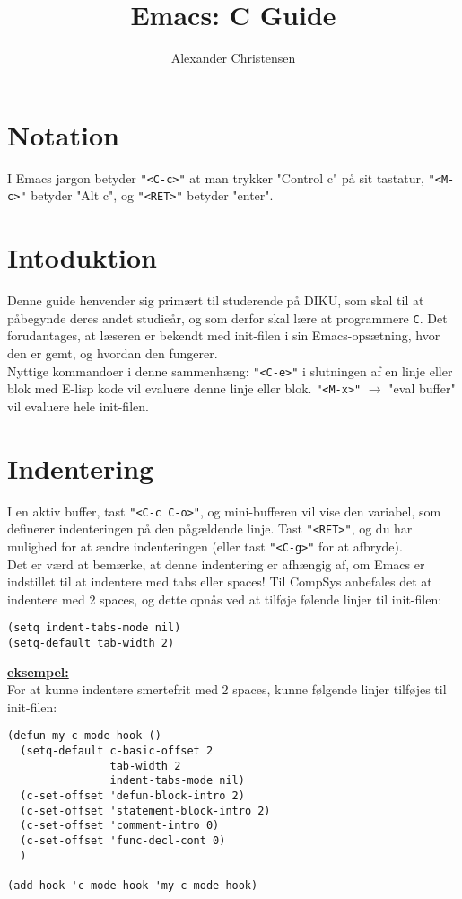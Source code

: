 \documentclass[a4paper, 9pt]{article}
\title{Emacs: C Guide}
\author{Alexander Christensen}
\newcommand{\key}[1]{\texttt{"<#1>"}}
\begin{document}
\maketitle


\section{Notation}
I Emacs jargon betyder \key{C-c} at man trykker "Control c" på sit tastatur, \key{M-c} betyder "Alt c", og \key{RET} betyder "enter".

\section{Intoduktion}
Denne guide henvender sig primært til studerende på DIKU, som skal til at påbegynde deres andet studieår, og som derfor skal lære at programmere \texttt{C}. Det forudantages, at læseren er bekendt med init-filen i sin Emacs-opsætning, hvor den er gemt, og hvordan den fungerer.\\

Nyttige kommandoer i denne sammenhæng: \key{C-e} i slutningen af en linje eller blok med E-lisp kode vil evaluere denne linje eller blok. \key{M-x} $\rightarrow$ "eval buffer" vil evaluere hele init-filen.


\newpage
\section{Indentering}
I en aktiv buffer, tast \key{C-c C-o}, og mini-bufferen vil vise den variabel, som definerer indenteringen på den pågældende linje. Tast \key{RET}, og du har mulighed for at ændre indenteringen (eller tast \key{C-g} for at afbryde).\\

Det er værd at bemærke, at denne indentering er afhængig af, om Emacs er indstillet til at indentere med tabs eller spaces! Til CompSys anbefales det at indentere med 2 spaces, og dette opnås ved at tilføje følende linjer til init-filen:
\begin{verbatim}
(setq indent-tabs-mode nil)
(setq-default tab-width 2)
\end{verbatim}

\vspace{3mm}\noindent\textbf{\underline{eksempel:}}\vspace{2mm}\\
For at kunne indentere smertefrit med 2 spaces, kunne følgende linjer tilføjes til init-filen:
\begin{verbatim}
(defun my-c-mode-hook ()
  (setq-default c-basic-offset 2
                tab-width 2
                indent-tabs-mode nil)
  (c-set-offset 'defun-block-intro 2)
  (c-set-offset 'statement-block-intro 2)
  (c-set-offset 'comment-intro 0)
  (c-set-offset 'func-decl-cont 0)
  )

(add-hook 'c-mode-hook 'my-c-mode-hook)
\end{verbatim}\vspace{2mm}
\end{document}
